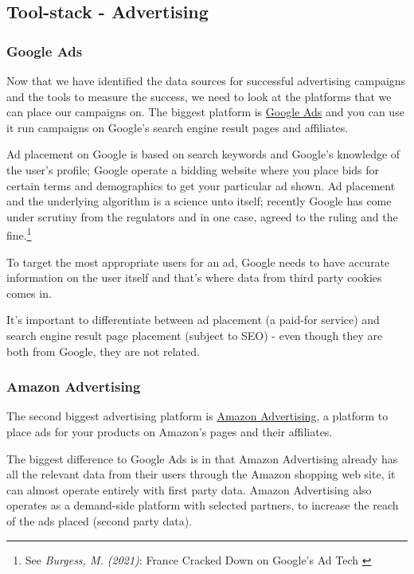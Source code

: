 \subsection{Tool-stack - Advertising}

\subsubsection{Google Ads}

Now that we have identified the data sources for successful advertising campaigns and the tools to measure the success, we need to look at the platforms that we can place our campaigns on. The biggest platform is \href{https://ads.google.com/home/}{Google Ads} and you can use it run campaigns on Google's search engine result pages and affiliates.

Ad placement on Google is based on search keywords and Google's knowledge of the user's profile; Google operate a bidding website where you place bids for certain terms and demographics to get your particular ad shown. Ad placement and the underlying algorithm is a science unto itself; recently Google has come under scrutiny from the regulators and in one case, agreed to the ruling and the fine.\footnote{See \textit{Burgess, M. (2021)}: France Cracked Down on Google’s Ad Tech \cite{googleAds}}

To target the most appropriate users for an ad, Google needs to have accurate information on the user itself and that's where data from third party cookies comes in.

It's important to differentiate between ad placement (a paid-for service) and search engine result page placement (subject to SEO) - even though they are both from Google, they are not related.

\subsubsection{Amazon Advertising}

The second biggest advertising platform is \href{https://advertising.amazon.com//}{Amazon Advertising}, a platform to place ads for your products on Amazon's pages and their affiliates.

The biggest difference to Google Ads is in that Amazon Advertising already has all the relevant data from their users through the Amazon shopping web site, it can almost operate entirely with first party data. Amazon Advertising also operates as a demand-side platform with selected partners, to increase the reach of the ads placed (second party data).

